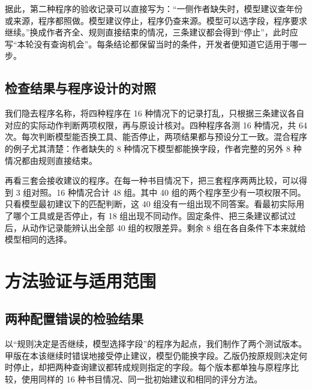 \documentclass[UTF8,12pt,a4paper,fontset=none]{ctexart}
\begin{document}
据此，第二种程序的验收记录可以直接写为：“一侧作者缺失时，模型建议查年份或来源，程序都照做。模型建议停止，程序仍查来源。模型可以选字段，程序要求继续。”换成作者齐全、规则直接结束的情况，三条建议都会得到“停止”，此时应写“本轮没有查询机会”。每条结论都保留当时的条件，开发者便知道它适用于哪一步。\par

\subsection{检查结果与程序设计的对照}

我们隐去程序名称，将四种程序在 16 种情况下的记录打乱，只根据三条建议各自对应的实际动作判断两项权限，再与原设计核对。四种程序各测 16 种情况，共 64 次。每次判断模型能否换工具、能否停止，两项结果都与预设分工一致。混合程序的例子尤其清楚：作者缺失的 8 种情况下模型都能换字段，作者完整的另外 8 种情况都由规则直接结束。\par

再看三套会接收建议的程序。在每一种书目情况下，把三套程序两两比较，可以得到 3 组对照。16 种情况合计 48 组。其中 40 组的两个程序至少有一项权限不同。只看模型最初建议下的匹配判断，这 40 组没有一组出现不同答案。看最初实际用了哪个工具或是否停止，有 18 组出现不同动作。固定条件、把三条建议都试过后，从动作记录能辨认出全部 40 组的权限差异。剩余 8 组在各自条件下本来就给模型相同的选择。\par

\section{方法验证与适用范围}

\subsection{两种配置错误的检验结果}

以“规则决定是否继续，模型选择字段”的程序为起点，我们制作了两个测试版本。甲版在本该继续时错误地接受停止建议，模型仍能换字段。乙版仍按原规则决定何时停止，却把两种查询建议都转成规则指定的字段。每个版本都单独与原程序比较，使用同样的 16 种书目情况、同一批初始建议和相同的评分方法。\par
\end{document}
